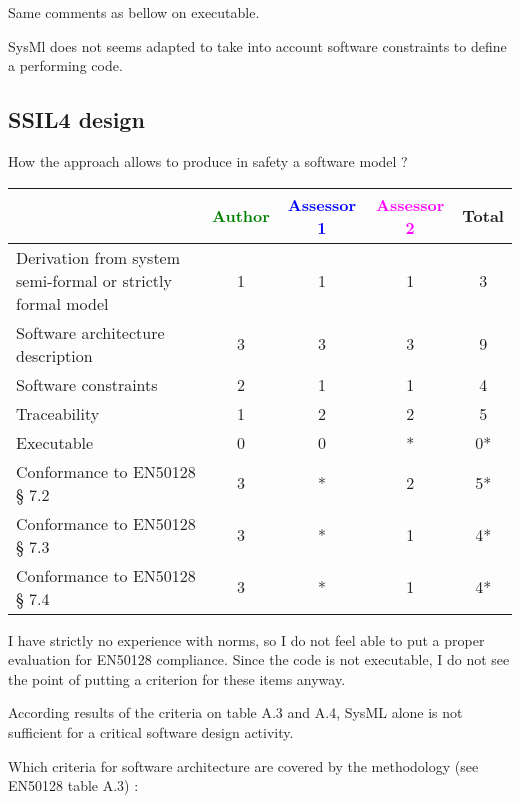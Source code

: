 \begin{assessor2}
Same comments as bellow on executable.

SysMl does not seems adapted to take into account software constraints to define a performing code.
\end{assessor2}

\subsection{SSIL4 design}

How the approach allows to produce in safety a software model ?

\begin{tabular}{|l | c | c | c | c|}
\hline
& \textcolor{green}{Author} & \textcolor{blue}{Assessor 1} & \textcolor{magenta}{Assessor 2} & Total \\
\hline
Derivation from system semi-formal or strictly formal model & 1 & 1 & 1 & 3 \\
\hline
Software architecture description & 3 & 3 & 3 & 9 \\
\hline
Software constraints & 2 & 1 & 1 & 4 \\
\hline
Traceability & 1 & 2 & 2 & 5 \\
\hline
Executable & 0 & 0 & * & 0* \\
\hline
Conformance to EN50128 § 7.2 & 3 & * & 2 & 5* \\
\hline
Conformance to EN50128 § 7.3 & 3 & * & 1 & 4* \\
\hline
Conformance to EN50128 § 7.4 & 3 & * & 1 & 4* \\
\hline
\end{tabular}

\begin{assessor1}
I have strictly no experience with norms, so I do not feel able to put a proper evaluation for EN50128 compliance. Since the code is not executable, I do not see the point of putting a criterion for these items anyway. 
\end{assessor1}


\begin{assessor2}
According results of the criteria on table A.3 and A.4, SysML alone is not sufficient for a critical software design activity.
\end{assessor2}


Which criteria for software architecture are covered by the methodology
(see EN50128 table A.3) :

